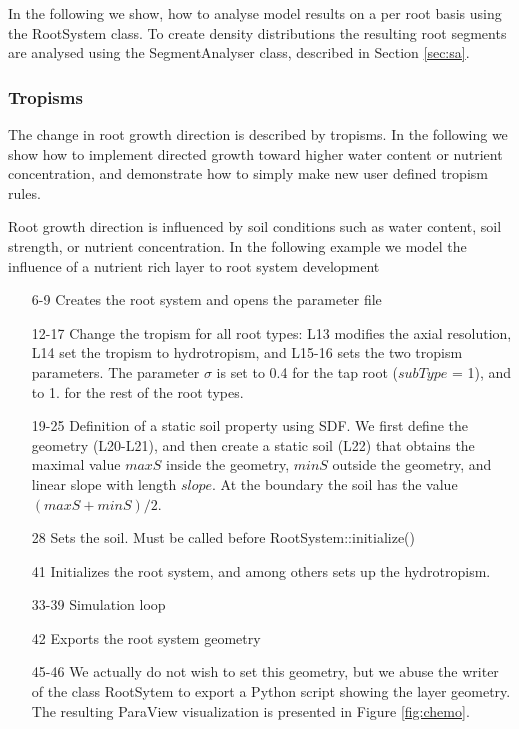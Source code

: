 In the following we show, how to analyse model results on a per root basis using the RootSystem class. To create density distributions the resulting root segments are analysed using the SegmentAnalyser class, described in Section \ref{sec:sa}.

\newpage
\subsubsection*{Tropisms} \label{sec:tropism}

The change in root growth direction is described by tropisms. In the following we show how to implement directed growth toward higher water content or nutrient concentration, and demonstrate how to simply make new user defined tropism rules. 


Root growth direction is influenced by soil conditions such as water content, soil strength, or nutrient concentration. In the following example we model the influence of a nutrient rich layer to root system development



\begin{itemize}

\item[6-9] Creates the root system and opens the parameter file

\item[12-17] Change the tropism for all root types: L13 modifies the axial resolution, L14 set the tropism to hydrotropism, and L15-16 sets the two tropism parameters. The parameter $\sigma$ is set to 0.4 for the tap root ($subType$ = 1), and to 1. for the rest of the root types.

\item[19-25] Definition of a static soil property using SDF. We first define the geometry (L20-L21), and then create a static soil (L22) that obtains the maximal value $maxS$ inside the geometry, 
$minS$ outside the geometry, and linear slope with length $slope$. At the boundary the soil has the value $(maxS+minS)/2$.

\item[28] Sets the soil. Must be called before RootSystem::initialize()

\item[41] Initializes the root system, and among others sets up the hydrotropism. 

\item[33-39] Simulation loop

\item[42] Exports the root system geometry

\item[45-46] We actually do not wish to set this geometry, but we abuse the writer of the class RootSytem to export a Python script showing the layer geometry. The resulting ParaView visualization is presented in Figure \ref{fig:chemo}.

\end{itemize}

